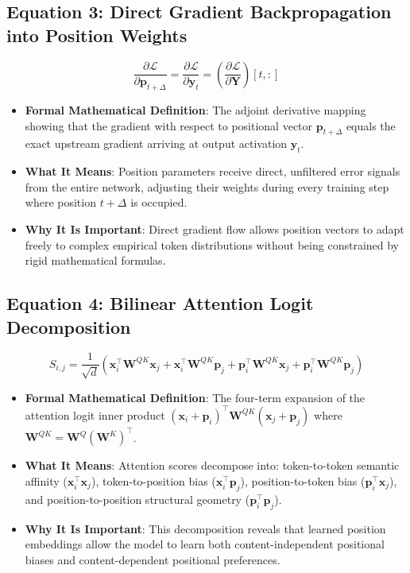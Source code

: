 \documentclass[11pt,a4paper]{article}
\theoremstyle{definition}
\begin{document}
\subsection{\textbf{Equation 3: Direct Gradient Backpropagation into Position Weights}}
{\boldmath
\begin{equation}
\frac{\partial \mathcal{L}}{\partial \mathbf{p}_{t + \Delta}} = \frac{\partial \mathcal{L}}{\partial \mathbf{y}_t} = \left(\frac{\partial \mathcal{L}}{\partial \mathbf{Y}}\right)[t, :]
\end{equation}
}
\begin{itemize}
    \item \textbf{Formal Mathematical Definition}:
    The adjoint derivative mapping showing that the gradient with respect to positional vector $\mathbf{p}_{t + \Delta}$ equals the exact upstream gradient arriving at output activation $\mathbf{y}_t$.
    \item \textbf{What It Means}:
    Position parameters receive direct, unfiltered error signals from the entire network, adjusting their weights during every training step where position $t+\Delta$ is occupied.
    \item \textbf{Why It Is Important}:
    Direct gradient flow allows position vectors to adapt freely to complex empirical token distributions without being constrained by rigid mathematical formulas.
\end{itemize}

\subsection{\textbf{Equation 4: Bilinear Attention Logit Decomposition}}
{\boldmath
\begin{equation}
S_{i, j} = \frac{1}{\sqrt{d}} \left( \mathbf{x}_i^\top \mathbf{W}^{QK} \mathbf{x}_j + \mathbf{x}_i^\top \mathbf{W}^{QK} \mathbf{p}_j + \mathbf{p}_i^\top \mathbf{W}^{QK} \mathbf{x}_j + \mathbf{p}_i^\top \mathbf{W}^{QK} \mathbf{p}_j \right)
\end{equation}
}
\begin{itemize}
    \item \textbf{Formal Mathematical Definition}:
    The four-term expansion of the attention logit inner product $(\mathbf{x}_i + \mathbf{p}_i)^\top \mathbf{W}^{QK} (\mathbf{x}_j + \mathbf{p}_j)$ where $\mathbf{W}^{QK} = \mathbf{W}^Q (\mathbf{W}^K)^\top$.
    \item \textbf{What It Means}:
    Attention scores decompose into: token-to-token semantic affinity ($\mathbf{x}_i^\top \mathbf{x}_j$), token-to-position bias ($\mathbf{x}_i^\top \mathbf{p}_j$), position-to-token bias ($\mathbf{p}_i^\top \mathbf{x}_j$), and position-to-position structural geometry ($\mathbf{p}_i^\top \mathbf{p}_j$).
    \item \textbf{Why It Is Important}:
    This decomposition reveals that learned position embeddings allow the model to learn both content-independent positional biases and content-dependent positional preferences.
\end{itemize}
\end{document}

